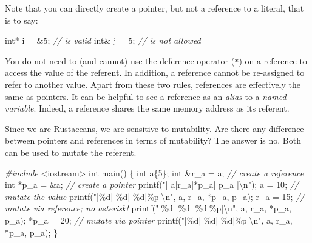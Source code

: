 \documentclass[
]{book}
\newenvironment{Shaded}{\begin{snugshade}}{\end{snugshade}}
\newcommand{\CommentTok}[1]{\textcolor[rgb]{0.56,0.35,0.01}{\textit{#1}}}
\newcommand{\DataTypeTok}[1]{\textcolor[rgb]{0.13,0.29,0.53}{#1}}
\newcommand{\DecValTok}[1]{\textcolor[rgb]{0.00,0.00,0.81}{#1}}
\newcommand{\ImportTok}[1]{#1}
\newcommand{\NormalTok}[1]{#1}
\newcommand{\PreprocessorTok}[1]{\textcolor[rgb]{0.56,0.35,0.01}{\textit{#1}}}
\newcommand{\SpecialCharTok}[1]{\textcolor[rgb]{0.00,0.00,0.00}{#1}}
\newcommand{\StringTok}[1]{\textcolor[rgb]{0.31,0.60,0.02}{#1}}
\begin{document}
Note that you can directly create a pointer, but not a reference to a literal, that is to say:

\begin{Shaded}
\begin{Highlighting}[]
\DataTypeTok{int}\NormalTok{* i = \&}\DecValTok{5}\NormalTok{; }\CommentTok{// is valid}
\DataTypeTok{int}\NormalTok{\& j = }\DecValTok{5}\NormalTok{;  }\CommentTok{// is not allowed}
\end{Highlighting}
\end{Shaded}

You do not need to (and cannot) use the deference operator (\texttt{*}) on a reference to access the value of the referent. In addition, a reference cannot be re-assigned to refer to another value. Apart from these two rules, references are effectively the same as pointers. It can be helpful to see a reference as an \emph{alias} to a \emph{named variable}. Indeed, a reference shares the same memory address as its referent.

Since we are Rustaceans, we are sensitive to mutability. Are there any difference between pointers and references in terms of mutability? The answer is no. Both can be used to mutate the referent.

\begin{Shaded}
\begin{Highlighting}[]
\PreprocessorTok{\#include }\ImportTok{\textless{}iostream\textgreater{}}
\DataTypeTok{int}\NormalTok{ main()}
\NormalTok{\{}
    \DataTypeTok{int}\NormalTok{ a\{}\DecValTok{5}\NormalTok{\};}
    \DataTypeTok{int}\NormalTok{ \&r\_a = a;  }\CommentTok{// create a reference}
    \DataTypeTok{int}\NormalTok{ *p\_a = \&a; }\CommentTok{// create a pointer}
\NormalTok{    printf(}\StringTok{"| a|r\_a|*p\_a|     p\_a      |}\SpecialCharTok{\textbackslash{}n}\StringTok{"}\NormalTok{);}
\NormalTok{    a = }\DecValTok{10}\NormalTok{; }\CommentTok{// mutate the value}
\NormalTok{    printf(}\StringTok{"|}\SpecialCharTok{\%d}\StringTok{| }\SpecialCharTok{\%d}\StringTok{|  }\SpecialCharTok{\%d}\StringTok{|}\SpecialCharTok{\%p}\StringTok{|}\SpecialCharTok{\textbackslash{}n}\StringTok{"}\NormalTok{, a, r\_a, *p\_a, p\_a);}
\NormalTok{    r\_a = }\DecValTok{15}\NormalTok{; }\CommentTok{// mutate via reference; no asterisk!}
\NormalTok{    printf(}\StringTok{"|}\SpecialCharTok{\%d}\StringTok{| }\SpecialCharTok{\%d}\StringTok{|  }\SpecialCharTok{\%d}\StringTok{|}\SpecialCharTok{\%p}\StringTok{|}\SpecialCharTok{\textbackslash{}n}\StringTok{"}\NormalTok{, a, r\_a, *p\_a, p\_a);}
\NormalTok{    *p\_a = }\DecValTok{20}\NormalTok{; }\CommentTok{// mutate via pointer}
\NormalTok{    printf(}\StringTok{"|}\SpecialCharTok{\%d}\StringTok{| }\SpecialCharTok{\%d}\StringTok{|  }\SpecialCharTok{\%d}\StringTok{|}\SpecialCharTok{\%p}\StringTok{|}\SpecialCharTok{\textbackslash{}n}\StringTok{"}\NormalTok{, a, r\_a, *p\_a, p\_a);}
\NormalTok{\}}
\end{Highlighting}
\end{Shaded}
\end{document}
